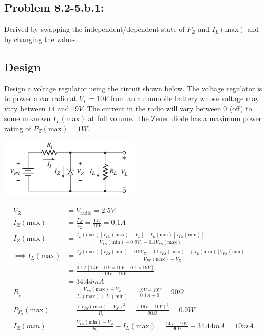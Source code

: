 \documentclass[12pt,letterpaper,titlepage]{article}
\begin{document}
\begin{raggedright}
\clearpage
\section{Problem 8.2-5.b.1: } Derived by swapping the independent/dependent state of $P_Z$ and $I_L(\text{max})$ and by changing the values.
\subsection{Design}
Design a voltage regulator using the circuit shown below.
 The voltage regulator is to power a car radio at $V_L = 10 V$ 
 from an automobile battery whose voltage may vary between $14$ and $19 V$. 
 The current in the radio will vary between $0$ (off) to some unknown $I_L(\text{max})$ at full volume.
 The Zener diode has a maximum power rating of $P_Z(\text{max}) = 1W$.
 
\begin{center}
\includegraphics[width=\textwidth, height=7\baselineskip, keepaspectratio=true]{ds2}
\end{center}

\begin{align}
	V_Z 
	  &= V_{\text{radio}} 
	   = 2.5V
\\  I_Z(\text{max}) 
	  &= \frac{P_Z}{V_Z} 
	   = \frac{1W}{10V}
	   = 0.1A
\\  I_Z(\text{max}) 
      &= \frac{
      	I_L(\text{max})[V_{PS}(\text{max}) - V_Z]-I_L(\text{min})[V_{PS}(\text{min})]
      	}{
      	V_{PS}(\text{min}) - 0.9V_Z - 0.1V_{PS}(\text{max})
      	}
\\ \implies 
	I_L(\text{max})
      &= \frac{
      	I_Z(\text{max})
      	[
      	V_{PS}(\text{min}) - 0.9V_Z - 0.1V_{PS}(\text{max})
      	]
      	+
      	I_L(\text{min})[V_{PS}(\text{min})]
      	}{
      	V_{PS}(\text{max}) - V_Z
      	}
\\    &= \frac{
      	0.1A
      	[
      	14V - 0.9\times10V - 0.1\times 19V
      	]
      	}{
      	19V - 10V
      	}
\\    &= 34.44mA
\\  R_i 
      &= \frac{V_{PS}(\text{max})-V_Z}{I_Z(\text{max}) + I_L(\text{min})}
       = \frac{19V - 10V}{0.1A + 0}
       = 90\Omega
\\  P_{R_i}(\text{max}) 
	  &= \frac{(V_{PS}(\text{max}) - V_Z)^2}{R_i}
	   = \frac{(19V - 10V)^2}{90\Omega}
	   = 0.9 W
\\  I_Z(min) 
	  &= \frac{V_{PS}(\text{min}) - V_Z}{R_i} - I_L(\text{max})
	   = \frac{14V-10V}{90\Omega} - 34.44mA
	   = 10mA
\end{align}


\end{raggedright}
\end{document}
